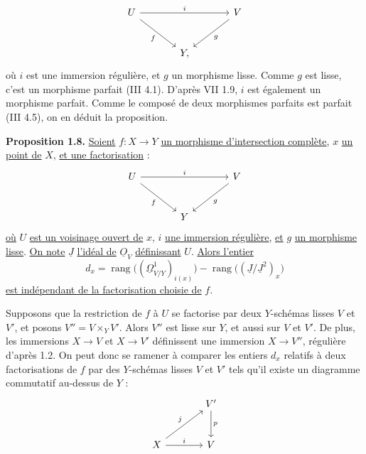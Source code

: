 
\[
\begin{tikzcd}[column sep=large,row sep=large]
U \arrow[rr,"i"] \arrow[dr,"f"'] && V \arrow[dl,"g"]\\
& Y, &
\end{tikzcd}
\]
où $i$ est une
immersion régulière, et $g$ un morphisme lisse. Comme $g$ est lisse, c'est un morphisme parfait (III 4.1). D'après VII 1.9, $i$ est également un morphisme parfait. Comme le composé de deux morphismes parfaits est parfait (III 4.5), on en déduit la proposition.

\textbf{Proposition 1.8.} \uline{Soient} $f:X\to Y$ \uline{un morphisme d'intersection complète}, $x$ \uline{un point de} $X$, \uline{et une factorisation} :
\[
\begin{tikzcd}[column sep=large,row sep=large]
U \arrow[rr,"i"] \arrow[dr,"f"'] && V \arrow[dl,"g"]\\
& Y &
\end{tikzcd}
\]
\uline{où} $U$ \uline{est un voisinage ouvert de} $x$, $i$ \uline{une immersion régulière}, \uline{et} $g$ \uline{un morphisme lisse}. \uline{On note} $\underline{J}$ \uline{l'idéal de} $\underline{O}_V$ \uline{définissant} $U$. \uline{Alors l'entier}
\[
d_x=\operatorname{rang}\bigl((\underline{\Omega}^1_{V/Y})_{i(x)}\bigr)-\operatorname{rang}\bigl((\underline{J}/\underline{J}^2)_x\bigr)
\]
\uline{est indépendant de la factorisation choisie de} $f$.

Supposons que la restriction de $f$ à $U$ se factorise par deux $Y$-schémas lisses $V$ et $V'$, et posons $V''=V\times_Y V'$. Alors $V''$ est lisse sur $Y$, et aussi sur $V$ et $V'$. De plus, les immersions $X\to V$ et $X\to V'$ définissent une immersion $X\to V''$, régulière d'après 1.2. On peut donc se ramener à comparer les entiers $d_x$ relatifs à deux factorisations de $f$ par des $Y$-schémas lisses $V$ et $V'$ tels qu'il existe un diagramme commutatif au-dessus de $Y$ :
\[
\begin{tikzcd}[column sep=large,row sep=large]
& V' \arrow[d,"p"]\\
X \arrow[ur,"j"] \arrow[r,"i"] & V
\end{tikzcd}
\]
